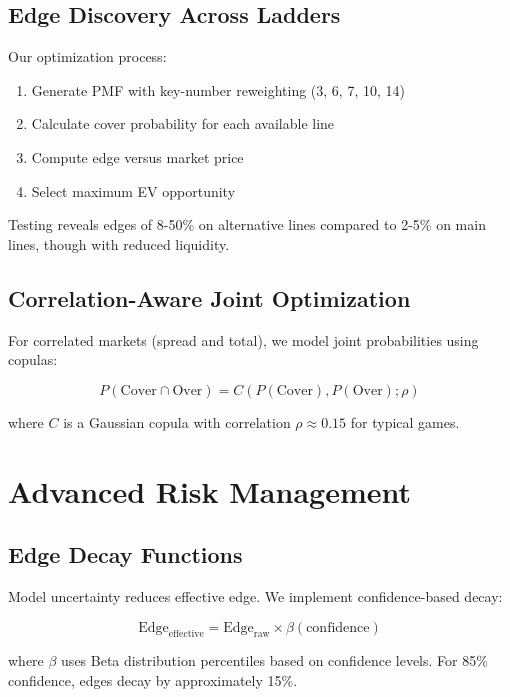 \subsection{Edge Discovery Across Ladders}

Our optimization process:
\begin{enumerate}
  \item Generate PMF with key-number reweighting (3, 6, 7, 10, 14)
  \item Calculate cover probability for each available line
  \item Compute edge versus market price
  \item Select maximum EV opportunity
\end{enumerate}

Testing reveals edges of 8-50\% on alternative lines compared to 2-5\% on main lines, though with reduced liquidity.

\subsection{Correlation-Aware Joint Optimization}

For correlated markets (spread and total), we model joint probabilities using copulas:

\begin{equation}
P(\text{Cover} \cap \text{Over}) = C(P(\text{Cover}), P(\text{Over}); \rho)
\end{equation}

where $C$ is a Gaussian copula with correlation $\rho \approx 0.15$ for typical games.

\section{Advanced Risk Management}

\subsection{Edge Decay Functions}

Model uncertainty reduces effective edge. We implement confidence-based decay:

\begin{equation}
\text{Edge}_{\text{effective}} = \text{Edge}_{\text{raw}} \times \beta(\text{confidence})
\end{equation}

where $\beta$ uses Beta distribution percentiles based on confidence levels. For 85\% confidence, edges decay by approximately 15\%.

